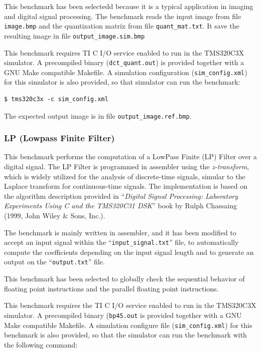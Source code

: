 This benchmark has been selectedd because it is a typical application in imaging and digital signal processing.
The benchmark reads the input image from file \texttt{image.bmp} and the quantization matrix from file \texttt{quant\_mat.txt}.
It save the resulting image in file \texttt{output\_image.sim.bmp}

This benchmark requires TI C I/O service enabled to run in the TMS320C3X simulator.
A precompiled binary (\texttt{dct\_quant.out}) is provided together with a GNU Make compatible Makefile.
A simulation configuration (\texttt{sim\_config.xml}) for this simulator is also provided, so that simulator can run the benchmark:

\begin{verbatim}
$ tms320c3x -c sim_config.xml
\end{verbatim}

The expected output image is in file \texttt{output\_image.ref.bmp}.

\subsubsection{LP (Lowpass Finite Filter)}
\label{tms320c3x_sec:benchmarks_lp}

This benchmark performs the computation of a LowPass Finite (LP) Filter over a digital signal.
The LP Filter is programmed in assembler using the \textit{z-transform}, which is widely utilized for the analysis of discrete-time signals, simular to the Laplace transform for continuous-time signals.
The implementation is based on the algorithm description provided in ``\textit{Digital Signal Processing: Laboratory Experiments Using C and the TMS320C31 DSK}'' book by Rulph Chassaing (1999, John Wiley \& Sons, Inc.).

The benchmark is mainly written in assembler, and it has been modified to accept an input signal within the ``\texttt{input\_signal.txt}'' file, to automatically compute the coefficients depending on the input signal length and to generate an output on the ``\texttt{output.txt}'' file.

This benchmark has been selected to globally check the sequential behavior of floating point instructions and the parallel floating point instructions.

This benchmark requires the TI C I/O service enabled to run in the TMS320C3X simulator.
A precompiled binary (\texttt{bp45.out} is provided together with a GNU Make compatible Makefile.
A simulation configure file (\texttt{sim\_config.xml}) for this benchmark is also provided, so that the simulator can run the benchmark with the following command:
  
